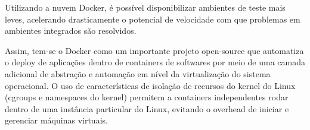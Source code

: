 Utilizando a nuvem Docker, é possível disponibilizar ambientes de
teste mais leves, acelerando drasticamente o potencial de velocidade
com que problemas em ambientes integrados são resolvidos.

Assim, tem-se o Docker como um importante projeto open-source
que automatiza o deploy de aplicações dentro de containers de
softwares por meio de uma camada adicional de abstração e automação
em nível da virtualização do sistema operacional. O uso de
características de isolação de recursos do kernel do Linux
(cgroups e namespaces do kernel) permitem a containers
independentes rodar dentro de uma instância particular do Linux,
evitando o overhead de iniciar e gerenciar máquinas virtuais.
